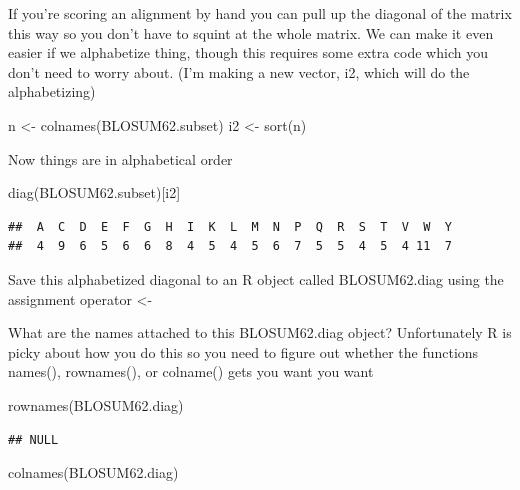 \documentclass[
]{book}
\newenvironment{Shaded}{\begin{snugshade}}{\end{snugshade}}
\newcommand{\FunctionTok}[1]{\textcolor[rgb]{0.00,0.00,0.00}{#1}}
\newcommand{\NormalTok}[1]{#1}
\newcommand{\OtherTok}[1]{\textcolor[rgb]{0.56,0.35,0.01}{#1}}
\begin{document}
If you're scoring an alignment by hand you can pull up the diagonal of the matrix this way so you don't have to squint at the whole matrix. We can make it even easier if we alphabetize thing, though this requires some extra code which you don't need to worry about. (I'm making a new vector, i2, which will do the alphabetizing)

\begin{Shaded}
\begin{Highlighting}[]
\NormalTok{n }\OtherTok{\textless{}{-}} \FunctionTok{colnames}\NormalTok{(BLOSUM62.subset)}
\NormalTok{i2 }\OtherTok{\textless{}{-}} \FunctionTok{sort}\NormalTok{(n)}
\end{Highlighting}
\end{Shaded}

Now things are in alphabetical order

\begin{Shaded}
\begin{Highlighting}[]
\FunctionTok{diag}\NormalTok{(BLOSUM62.subset)[i2]}
\end{Highlighting}
\end{Shaded}

\begin{verbatim}
##  A  C  D  E  F  G  H  I  K  L  M  N  P  Q  R  S  T  V  W  Y 
##  4  9  6  5  6  6  8  4  5  4  5  6  7  5  5  4  5  4 11  7
\end{verbatim}

Save this alphabetized diagonal to an R object called BLOSUM62.diag using the assignment operator \textless-

What are the names attached to this BLOSUM62.diag object? Unfortunately R is picky about how you do this so you need to figure out whether the functions names(), rownames(), or colname() gets you want you want

\begin{Shaded}
\begin{Highlighting}[]
\FunctionTok{rownames}\NormalTok{(BLOSUM62.diag)}
\end{Highlighting}
\end{Shaded}

\begin{verbatim}
## NULL
\end{verbatim}

\begin{Shaded}
\begin{Highlighting}[]
\FunctionTok{colnames}\NormalTok{(BLOSUM62.diag)}
\end{Highlighting}
\end{Shaded}
\end{document}
